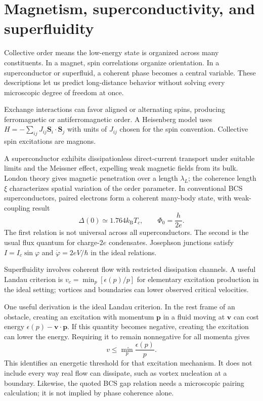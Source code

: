 \documentclass[11pt,oneside]{book}
\newcommand{\vect}[1]{\boldsymbol{#1}}
\newcommand{\kb}{k_{\mathrm B}}
\theoremstyle{reviewstyle}
\begin{document}
\section{Magnetism, superconductivity, and superfluidity}
Collective order means the low-energy state is organized across many constituents. In a magnet, spin correlations organize orientation. In a superconductor or superfluid, a coherent phase becomes a central variable. These descriptions let us predict long-distance behavior without solving every microscopic degree of freedom at once.

Exchange interactions can favor aligned or alternating spins, producing ferromagnetic or antiferromagnetic order. A Heisenberg model uses $H=-\sum_{ij}J_{ij}\vect S_i\cdot\vect S_j$ with units of $J_{ij}$ chosen for the spin convention. Collective spin excitations are magnons.

A superconductor exhibits dissipationless direct-current transport under suitable limits and the Meissner effect, expelling weak magnetic fields from its bulk. London theory gives magnetic penetration over a length $\lambda_L$; the coherence length $\xi$ characterizes spatial variation of the order parameter. In conventional BCS superconductors, paired electrons form a coherent many-body state, with weak-coupling result
\begin{equation}\Delta(0)\simeq1.764\kb T_c,\qquad \Phi_0=\frac{h}{2e}.\end{equation}
The first relation is not universal across all superconductors. The second is the usual flux quantum for charge-$2e$ condensates. Josephson junctions satisfy $I=I_c\sin\varphi$ and $\dot\varphi=2eV/\hbar$ in the ideal relations.

Superfluidity involves coherent flow with restricted dissipation channels. A useful Landau criterion is $v_c=\min_p[\epsilon(p)/p]$ for elementary excitation production in the ideal setting; vortices and boundaries can lower observed critical velocities.

One useful derivation is the ideal Landau criterion. In the rest frame of an obstacle, creating an excitation with momentum $\vect p$ in a fluid moving at $\vect v$ can cost energy $\epsilon(p)-\vect v\cdot\vect p$. If this quantity becomes negative, creating the excitation can lower the energy. Requiring it to remain nonnegative for all momenta gives
\begin{equation}
v\leq\min_p\frac{\epsilon(p)}p.
\end{equation}
This identifies an energetic threshold for that excitation mechanism. It does not include every way real flow can dissipate, such as vortex nucleation at a boundary. Likewise, the quoted BCS gap relation needs a microscopic pairing calculation; it is not implied by phase coherence alone.
\end{document}

